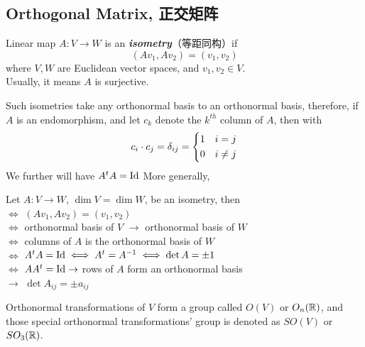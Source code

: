 \subsection{Orthogonal Matrix, 正交矩阵}
\begin{definition}
    Linear map $A: V \to W$ is an \textbf{\textit{isometry}}（等距同构）if
    $$(Av_1, Av_2) = (v_1, v_2)$$
    where $V, W$ are Euclidean vector spaces, and $v_1, v_2 \in V$. \\
    Usually, it means $A$ is surjective.
\end{definition}
Such isometries take any orthonormal basis to an orthonormal basis, therefore, if $A$ is an endomorphism, and let $c_k$ denote the $k^{th}$ column of $A$, then with
$$c_i \cdot c_j = \delta_{ij} = \begin{dcases}
        1 & i = j \\
        0 & i \ne j
    \end{dcases}$$
We further will have $A^tA = \text{Id}$
More generally,
\begin{theorem}
    Let $A: V \to W$, $\dim V = \dim W$, be an isometry, then \\
    $\iff$ $(Av_1, Av_2) = (v_1, v_2)$ \\
    $\iff$ orthonormal basis of $V$ $\to$ orthonormal basis of $W$ \\
    $\iff$ columns of $A$ is the orthonormal basis of $W$ \\
    $\iff$ $A^tA = \text{Id} \iff A^t = A^{-1} \iff \det A = \pm 1$ \\
    $\iff$ $AA^t = \text{Id} \to$ rows of $A$ form an orthonormal basis \\
    $\to$ $\det A_{ij} = \pm a_{ij}$
\end{theorem}
Orthonormal transformations of $V$ form a group called $O(V)$ or $O_n(\mathbb{R})$, and those special orthonormal transformations' group is denoted as $SO(V)$ or $SO_3(\mathbb{R})$.
\newpage